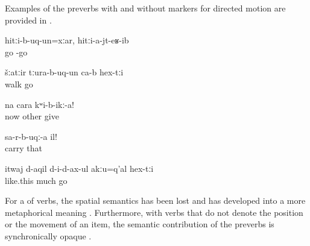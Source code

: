 Examples of the preverbs with and without markers for directed motion are provided in .

\begin{exe}
	\ex	\label{ex:Even though (the hare) run after (the turtle), it did not reach it verbs}
	\gll	hitːi-b-uq-un=xːar,	hitːi-a-jt-eʁ-ib\\
		go	-go\\
	\glt	{}

	\ex	\label{ex:They went out for a walk verbs}
	\gll	šːatːir	tːura-b-uq-un	ca-b	hex-tːi\\
		walk	go		\\
	\glt	{}

	\ex	\label{ex:Now give another (picture) verbs}
	\gll	na	cara	kʷi-b-ikː-a!\\
		now	other	give\\
	\glt	{}

	\ex	\label{ex:Take it away (from in front) verbs}
	\gll	sa-r-b-uqː-a	il!\\
		carry	that\\
	\glt	{}

	\ex	\label{ex:Otherwise not much (hay) fits inside verbs}
	\gll	itwaj	d-aqil	d-i-d-ax-ul	akːu=q'al	hex-tːi\\
		like.this	much	go		\\
	\glt	{}
\end{exe}

For a  of verbs, the spatial semantics has been lost and has developed into a more metaphorical meaning . Furthermore, with verbs that do not denote the position or the movement of an item, the semantic contribution of the preverbs is synchronically opaque \xxref{ex:He is listening carefully to him verbs@3}{ex:I did not see it. [There is no lock}.

